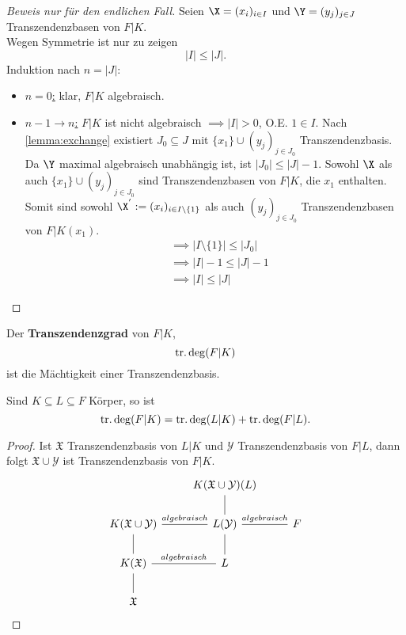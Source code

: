 \begin{proof}[Beweis nur für den endlichen Fall]
    Seien $\X=(x_i)_{i \in I}$ und $\Y = (y_j)_{j \in J}$ Transzendenzbasen von $F|K$.\\
    Wegen Symmetrie ist nur zu zeigen
    $$ |I| \leq |J|. $$
    Induktion nach $n = |J|$:
    \begin{itemize}[label=]
        \item \underline{$n=0$:} klar, $F|K$ algebraisch.
        \item  \underline{$n-1 \to n$:} $F|K$ ist nicht algebraisch 
        $\implies |I| > 0$, O.E. $1 \in I$. Nach \cref{lemma:exchange} existiert $J_0 \subseteq J$ mit
        $\{x_1\} \cup (y_j)_{j\in J_0}$ Transzendenzbasis. 
        Da $\Y$ maximal algebraisch unabhängig ist, ist $|J_0| \leq |J| -1$.
        Sowohl $\X$ als auch $\{x_1\} \cup (y_j)_{j \in J_0}$ sind Transzendenzbasen von $F|K$, die $x_1$ enthalten.
        Somit sind sowohl $\X^{'}:= (x_i)_{i \in I\setminus \{1\}}$ als auch $(y_j)_{j \in J_0}$ Transzendenzbasen von $F|K(x_1)$.
        \begin{align*}
            &\implies |I \setminus\{1\}| \leq |J_0| \\
            &\implies |I| -1 \leq |J| -1 \\
            &\implies |I| \leq |J|            
        \end{align*}
    \end{itemize}
\end{proof}

\begin{definition}
    Der \textbf{Transzendenzgrad} von $F|K$, 
    $$ \operatorname{tr.deg}(F|K) $$ ist die Mächtigkeit einer Transzendenzbasis.
\end{definition}

\begin{korollar}
    Sind $K \subseteq L \subseteq F$ Körper, so ist 
    $$ \operatorname{tr.deg}(F|K) = \operatorname{tr.deg}(L|K) + \operatorname{tr.deg}(F|L). $$
\end{korollar}
\begin{proof}
    Ist $\mathfrak{X}$ Transzendenzbasis von $L|K$ und $\mathcal{Y}$ Transzendenzbasis von $F|L$, dann folgt
    $ \mathfrak{X} \cup \mathcal{Y}$ ist Transzendenzbasis von $F|K$.
    $$\begin{tikzcd}
        & K(\mathfrak{X} \cup \mathcal{Y})(L) & \\
        K(\mathfrak{X} \cup \mathcal{Y}) \rar[dash]{algebraisch} & L(\mathcal{Y}) \uar[dash] \rar[dash]{algebraisch} & F \\
        K(\mathfrak{X}) \uar[dash] \rar[dash]{algebraisch}& L \uar[dash] & \\
        \mathfrak{X} \uar[dash] & &
    \end{tikzcd}$$
\end{proof}


